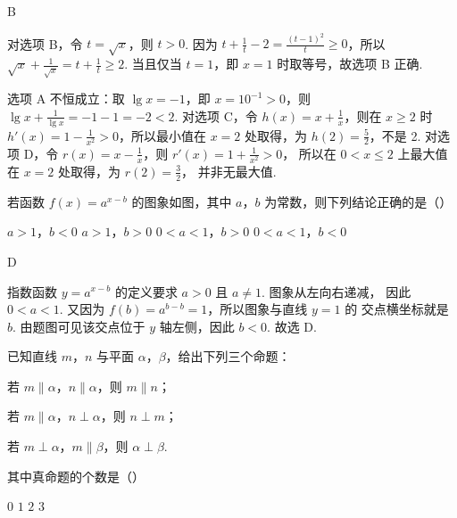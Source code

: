 \begin{answer}
B
\end{answer}

\begin{solution}
对选项 B，令 \(t=\sqrt{x}\)，则 \(t>0\). 因为
\(t+\frac{1}{t}-2=\frac{(t-1)^2}{t}\geqslant0\)，所以
\(\sqrt{x}+\frac{1}{\sqrt{x}}=t+\frac{1}{t}\geqslant2\). 当且仅当
\(t=1\)，即 \(x=1\) 时取等号，故选项 B 正确.

选项 A 不恒成立：取 \(\lg x=-1\)，即 \(x=10^{-1}>0\)，则
\(\lg x+\frac{1}{\lg x}=-1-1=-2<2\). 对选项 C，令
\(h(x)=x+\frac{1}{x}\)，则在 \(x\geqslant2\) 时
\(h'(x)=1-\frac{1}{x^2}>0\)，所以最小值在 \(x=2\) 处取得，为
\(h(2)=\frac{5}{2}\)，不是 2. 对选项 D，令
\(r(x)=x-\frac{1}{x}\)，则 \(r'(x)=1+\frac{1}{x^2}>0\)，
所以在 \(0<x\leqslant2\) 上最大值在 \(x=2\) 处取得，为 \(r(2)=\frac{3}{2}\)，
并非无最大值.
\end{solution}

\begin{problem}
若函数 \( f(x) = a^{x - b} \) 的图象如图，其中 \(a\)，\(b\) 为常数，则下列结论正确的是（\quad）


\choices
    {\(a > 1\)，\(b < 0\)}
    {\(a > 1\)，\(b > 0\)}
    {\(0 < a < 1\)，\(b > 0\)}
    {\(0 < a < 1\)，\(b < 0\)}
\end{problem}

\begin{answer}
D
\end{answer}

\begin{solution}
指数函数 \(y=a^{x-b}\) 的定义要求 \(a>0\) 且 \(a\neq1\). 图象从左向右递减，
因此 \(0<a<1\). 又因为 \(f(b)=a^{b-b}=1\)，所以图象与直线 \(y=1\) 的
交点横坐标就是 \(b\). 由题图可见该交点位于 \(y\) 轴左侧，因此 \(b<0\). 故选 D.
\end{solution}

\begin{problem}
已知直线 \(m\)，\(n\) 与平面 \(\alpha\)，\(\beta\)，给出下列三个命题：

\begin{circlelist}
\item 若 \(m \parallel \alpha\)，\(n \parallel \alpha\)，则 \(m \parallel n\)；
\item 若 \(m \parallel \alpha\)，\(n \perp \alpha\)，则 \(n \perp m\)；
\item 若 \(m \perp \alpha\)，\(m \parallel \beta\)，则 \(\alpha \perp \beta\).
\end{circlelist}

其中真命题的个数是（\quad）

\choices
    {\(0\)}
    {\(1\)}
    {\(2\)}
    {\(3\)}
\end{problem}

